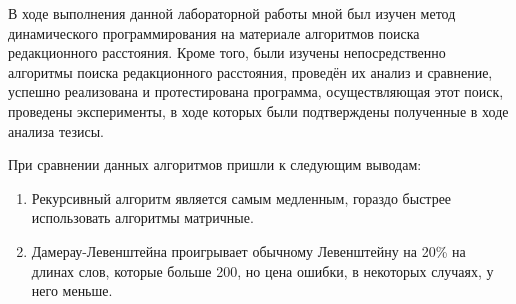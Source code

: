 \Conclusion %

В ходе выполнения данной лабораторной работы мной был изучен метод динамического программирования на материале алгоритмов поиска редакционного расстояния. Кроме того, были изучены непосредственно алгоритмы поиска редакционного расстояния, проведён их анализ и сравнение, успешно реализована и протестирована программа, осуществляющая этот поиск, проведены эксперименты, в ходе которых были подтверждены полученные в ходе анализа тезисы.

При сравнении данных алгоритмов пришли к следующим выводам:
\begin{enumerate}
 	\item Рекурсивный алгоритм является самым медленным, гораздо быстрее использовать алгоритмы матричные.   
 	\item Дамерау-Левенштейна проигрывает обычному Левенштейну на 20\% на длинах слов, которые больше 200, но цена ошибки, в некоторых случаях, у него меньше.
\end{enumerate}

